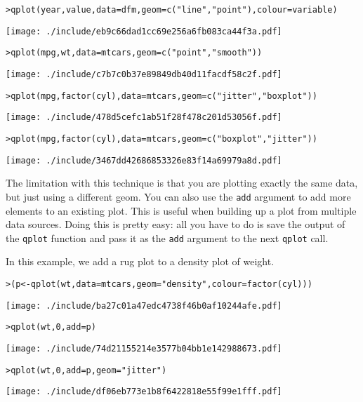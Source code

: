 \begin{alltt}
> qplot(year, value, data = dfm, geom = c("line", "point"), colour = variable)
\end{alltt}
\texttt{[image: ./include/eb9c66dad1cc69e256a6fb083ca44f3a.pdf]}
\begin{alltt}

> qplot(mpg, wt, data = mtcars, geom = c("point", "smooth"))
\end{alltt}
\texttt{[image: ./include/c7b7c0b37e89849db40d11facdf58c2f.pdf]}
\begin{alltt}

> qplot(mpg, factor(cyl), data = mtcars, geom = c("jitter", "boxplot"))
\end{alltt}
\texttt{[image: ./include/478d5cefc1ab51f28f478c201d53056f.pdf]}
\begin{alltt}

> qplot(mpg, factor(cyl), data = mtcars, geom = c("boxplot", "jitter"))
\end{alltt}
\texttt{[image: ./include/3467dd42686853326e83f14a69979a8d.pdf]}
\begin{alltt}

\end{alltt}

The limitation with this technique is that you are plotting exactly the same data, but just using a different geom.  You can also use the {\tt add} argument to add more elements to an existing plot.  This is useful when building up a plot from multiple data sources. Doing this is pretty easy: all you have to do is save the output of the {\tt qplot} function and pass it as the {\tt add} argument to the next {\tt qplot} call.

In this example, we add a rug plot to a density plot of weight.

\begin{alltt}
> (p <- qplot(wt, data = mtcars, geom = "density", colour = factor(cyl)))
\end{alltt}
\texttt{[image: ./include/ba27c01a47edc4738f46b0af10244afe.pdf]}
\begin{alltt}

> qplot(wt, 0, add = p)
\end{alltt}
\texttt{[image: ./include/74d21155214e3577b04bb1e142988673.pdf]}
\begin{alltt}

> qplot(wt, 0, add = p, geom = "jitter")
\end{alltt}
\texttt{[image: ./include/df06eb773e1b8f6422818e55f99e1fff.pdf]}
\begin{alltt}

\end{alltt}

